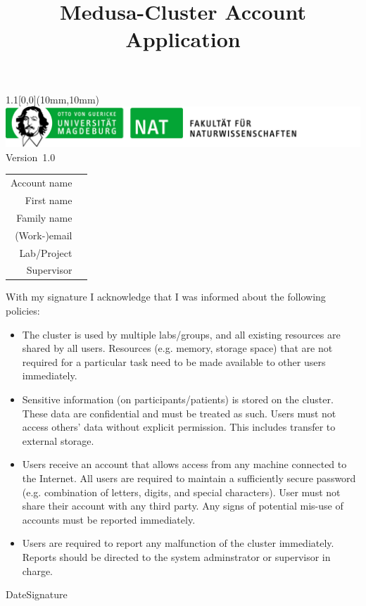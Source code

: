 \documentclass[paper=a4]{scrartcl}
\title{Medusa-Cluster Account Application}
\date{}
\begin{document}
\maketitle
\thispagestyle{empty}
\begin{textblock*}{1.1\linewidth}[0,0](10mm,10mm)%
  \includegraphics[width=\linewidth]{unibrief_logo_nat.png}%
  Version~1.0
\end{textblock*}

\vspace{-2.5cm}
\setlength{\extrarowheight}{1cm}

\begin{tabular}[]{rl}
  Account name & \uline{\hspace{10cm}} \\
  First name & \uline{\hspace{10cm}} \\
  Family name & \uline{\hspace{10cm}} \\
  (Work-)email & \uline{\hspace{10cm}} \\
  Lab/Project & \uline{\hspace{10cm}} \\
  Supervisor & \uline{\hspace{10cm}} \\
\end{tabular}

\vspace{1cm}
\noindent With my signature I acknowledge that I was informed about the
following policies:
\begin{itemize}
  \item The cluster is used by multiple labs/groups, and all existing resources
    are shared by all users. Resources (e.g. memory, storage space) that are not
    required for a particular task need to be made available to other users
    immediately.
  \item Sensitive information (on participants/patients) is stored on the
    cluster. These data are confidential and must be treated as such.
    Users must not access others' data without explicit permission. This includes
    transfer to external storage.
  \item Users receive an account that allows access from any machine connected
    to the Internet. All users are required to maintain a sufficiently secure
    password (e.g. combination of letters, digits, and special characters).
    User must not share their account with any third party.
    Any signs of potential mis-use of accounts must be reported immediately.
  \item Users are required to report any malfunction of the cluster immediately.
    Reports should be directed to the system adminstrator or supervisor in
    charge.

\end{itemize}
\vspace{3cm}

\hspace{2cm}Date\hfill Signature\hspace{2cm}
\end{document}
